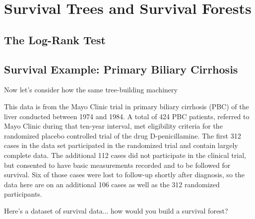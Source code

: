 \chapter{Survival Trees and Survival Forests}



\section{The Log-Rank Test}



\section{Survival Example: Primary Biliary Cirrhosis}

Now let's consider how the same tree-building machinery 

This data is from the Mayo Clinic trial in primary biliary cirrhosis (PBC) of the liver conducted between 1974 and 1984. A total of 424 PBC patients, referred to Mayo Clinic during that ten-year interval, met eligibility criteria for the randomized placebo controlled trial of the drug D-penicillamine. The first 312 cases in the data set participated in the randomized trial and contain largely complete data. The additional 112 cases did not participate in the clinical trial, but consented to have basic measurements recorded and to be followed for survival. Six of those cases were lost to follow-up shortly after diagnosis, so the data here are on an additional 106 cases as well as the 312 randomized participants.



\begin{question}{}
Here's a dataset of survival data... how would you build a survival forest?
\end{question}
